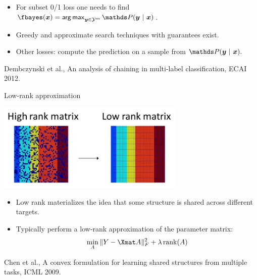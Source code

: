 \begin{frame}[fragile]
	\vspace{0.1cm}
	\begin{itemize}\small
		\item For subset 0/1 loss one needs to find $
		\fbayes(\xv) = \argmax_{\yv \in \Yspace^m} \P(\yv ~|~ \xv)
		$.
		\item Greedy and approximate search techniques with guarantees exist.
		\item Other losses: compute the prediction on a sample from $\P(\yv ~|~  \xv).$
	\end{itemize}
{\tiny Dembczynski et al., An analysis of chaining in multi-label classification, ECAI 2012.}
	
\end{frame}



\begin{frame}{Low-rank approximation}
	
	\begin{center}
		\includegraphics[width=9cm]{figure/lowrank}
	\end{center}

	\begin{itemize}
%		
		\item Low rank materializes the idea that some structure is shared across different targets.
%
		\item 	Typically perform a low-rank approximation of the parameter matrix:
		$$\min_A \|Y - \Xmat A \|^2_F + \lambda \, \mathrm{rank}(A)$$
%		
	\end{itemize}
	{\tiny Chen et al., A convex formulation for learning shared structures from
	multiple tasks, ICML 2009.}
\end{frame}




